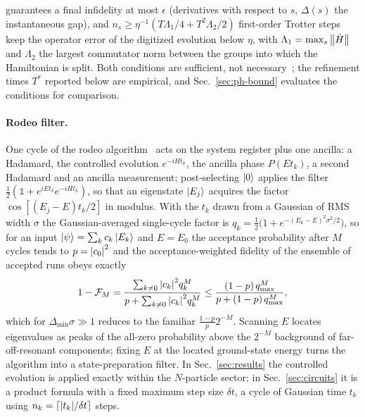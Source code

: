 \documentclass[
  aps,            %
  prc,            %
  reprint,        %
  superscriptaddress,
  floatfix,
  nofootinbib
]{revtex4-2}
\begin{document}
guarantees a final infidelity at most $\epsilon$ (derivatives with respect to
$s$, $\Delta(s)$ the instantaneous gap), and
$n_s\ge\eta^{-1}(T\Lambda_1/4+T^2\Lambda_2/2)$ first-order Trotter steps
keep the operator error of the digitized evolution below $\eta$, with
$\Lambda_1=\max_s\norm{\dot H}$ and $\Lambda_2$ the largest commutator norm
between the groups into which the Hamiltonian is split.  Both conditions are
sufficient, not necessary~\cite{Sadia2026,Kovalsky2023}; the refinement
times $T^{*}$ reported below are empirical, and Sec.~\ref{sec:ph-bound}
evaluates the conditions for comparison.

\paragraph{Rodeo filter.}
One cycle of the rodeo algorithm~\cite{Choi2021,Qian2024} acts on the system
register plus one ancilla: a Hadamard, the controlled evolution
$e^{-iHt_k}$, the ancilla phase $P(Et_k)$, a second Hadamard and an ancilla
measurement; post-selecting $\ket0$ applies the filter
$\tfrac12(\mathbb 1+e^{iEt_k}e^{-iHt_k})$, so that an eigenstate $\ket{E_j}$
acquires the factor $\cos[(E_j-E)t_k/2]$ in modulus.  With the $t_k$ drawn
from a Gaussian of RMS width $\sigma$ the Gaussian-averaged single-cycle
factor is $q_k=\tfrac12\big(1+e^{-(E_k-E)^2\sigma^2/2}\big)$, so for an
input $\ket\psi=\sum_k c_k\ket{E_k}$ and $E=E_0$ the acceptance probability
after $M$ cycles tends to $p=\abs{c_0}^2$ and the acceptance-weighted
fidelity of the ensemble of accepted runs obeys exactly
\begin{equation}
  1-\mathcal{F}_M=\frac{\sum_{k\neq0}\abs{c_k}^2 q_k^{M}}
                       {p+\sum_{k\neq0}\abs{c_k}^2 q_k^{M}}
  \le\frac{(1-p)\,q_{\max}^{M}}{p+(1-p)\,q_{\max}^{M}},
  \label{eq:fid}
\end{equation}
which for $\Delta_{\min}\sigma\gg1$ reduces to the familiar
$\tfrac{1-p}{p}2^{-M}$.  Scanning $E$ locates eigenvalues as peaks of the
all-zero probability above the $2^{-M}$ background of far-off-resonant
components; fixing $E$ at the located ground-state energy turns the
algorithm into a state-preparation filter.  In Sec.~\ref{sec:results} the
controlled evolution is applied exactly within the $N$-particle sector; in
Sec.~\ref{sec:circuits} it is a product formula with a fixed maximum step
size $\delta t$, a cycle of Gaussian time $t_k$ using
$n_k=\lceil\abs{t_k}/\delta t\rceil$ steps.
\end{document}
